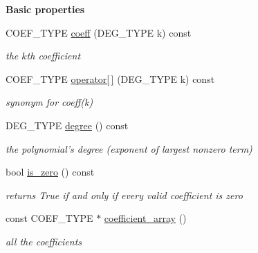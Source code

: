 \begin{Indent}\textbf{ Basic properties}\par
\begin{DoxyCompactItemize}
\item 
\mbox{\label{group__polygroup_add45ee2cac1598b8069d0375190461dc}} 
C\+O\+E\+F\+\_\+\+T\+Y\+PE \hyperlink{group__polygroup_add45ee2cac1598b8069d0375190461dc}{coeff} (D\+E\+G\+\_\+\+T\+Y\+PE k) const
\begin{DoxyCompactList}\small\item\em the $k$th coefficient \end{DoxyCompactList}\item 
\mbox{\label{group__polygroup_af39a736de8d5640ac943d358396f1f85}} 
C\+O\+E\+F\+\_\+\+T\+Y\+PE \hyperlink{group__polygroup_af39a736de8d5640ac943d358396f1f85}{operator\mbox{[}$\,$\mbox{]}} (D\+E\+G\+\_\+\+T\+Y\+PE k) const
\begin{DoxyCompactList}\small\item\em synonym for {\ttfamily coeff(k)} \end{DoxyCompactList}\item 
\mbox{\label{group__polygroup_a5099a83e73b6b86f310a9ef56ffd5689}} 
D\+E\+G\+\_\+\+T\+Y\+PE \hyperlink{group__polygroup_a5099a83e73b6b86f310a9ef56ffd5689}{degree} () const
\begin{DoxyCompactList}\small\item\em the polynomial's degree (exponent of largest nonzero term) \end{DoxyCompactList}\item 
\mbox{\label{group__polygroup_ac5251f81aaecea090443ed6cff755da4}} 
bool \hyperlink{group__polygroup_ac5251f81aaecea090443ed6cff755da4}{is\+\_\+zero} () const
\begin{DoxyCompactList}\small\item\em returns {\ttfamily True} if and only if every valid coefficient is zero \end{DoxyCompactList}\item 
\mbox{\label{group__polygroup_ae10c30e8f3b0702d6ec0c90b2feedb23}} 
const C\+O\+E\+F\+\_\+\+T\+Y\+PE $\ast$ \hyperlink{group__polygroup_ae10c30e8f3b0702d6ec0c90b2feedb23}{coefficient\+\_\+array} ()
\begin{DoxyCompactList}\small\item\em all the coefficients \end{DoxyCompactList}\end{DoxyCompactItemize}
\end{Indent}
